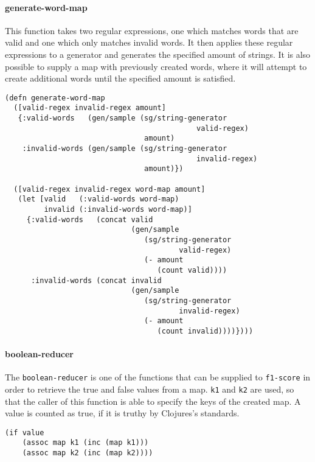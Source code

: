 \documentclass[runningheads]{llncs}
\begin{document}
\paragraph{generate-word-map}
This function takes two regular expressions, one which matches words that are valid and one which only matches invalid words. It then applies these regular expressions to a generator and generates the specified amount of strings. It is also possible to supply a map with previously created words, where it will attempt to create additional words until the specified amount is satisfied.
\begin{lstlisting}
(defn generate-word-map
  ([valid-regex invalid-regex amount]
   {:valid-words   (gen/sample (sg/string-generator
                                            valid-regex)
                                amount)
    :invalid-words (gen/sample (sg/string-generator
                                            invalid-regex)
                                amount)})

  ([valid-regex invalid-regex word-map amount]
   (let [valid   (:valid-words word-map)
         invalid (:invalid-words word-map)]
     {:valid-words   (concat valid
                             (gen/sample
                                (sg/string-generator
                                        valid-regex)
                                (- amount
                                   (count valid))))
      :invalid-words (concat invalid
                             (gen/sample
                                (sg/string-generator
                                        invalid-regex)
                                (- amount
                                   (count invalid))))})))
\end{lstlisting}

\paragraph{boolean-reducer}
The \texttt{boolean-reducer} is one of the functions that can be supplied to \texttt{f1-score} in order to retrieve the true and false values from a map. \texttt{k1} and \texttt{k2} are used, so that the caller of this function is able to specify the keys of the created map. A value is counted as true, if it is truthy by Clojures's standards.
\begin{lstlisting}
(if value
    (assoc map k1 (inc (map k1)))
    (assoc map k2 (inc (map k2))))
\end{lstlisting}
\end{document}
